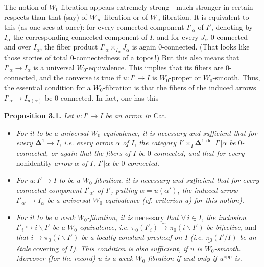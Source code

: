 \documentclass[11pt]{article}
\newcommand{\printedpage}[1]{\marginpar{\footnotesize p.~#1}}
\newcommand{\msp}[1]{\marginpar{\footnotesize [#1]}}
\newcommand{\defeq}{\overset{\text{def}}{=}}
\begin{document}
\printedpage{27}
\msp{page 41}
The notion of $W_0$-fibration appears extremely strong - much stronger in certain respects than that (say) of $W_\infty$-fibration or of $W_\omega$-fibration. It is equivalent to this (as one sees at once): for every connected component $I'_\alpha$ of $I'$, denoting by $I_\alpha$ the corresponding connected component of $I$, and for every $J_\alpha$ 0-connected and over $I_\alpha$, the fiber product $I'_\alpha \times_{I_\alpha} J_\alpha$ is again 0-connected. (That looks like those stories of total 0-connectedness of a topos\,!) But this also means that $I'_\alpha \longrightarrow I_\alpha$ is a universal $W_0$-equivalence. This implies that its fibers are 0-connected, and the converse is true if $u : I' \longrightarrow I$ is $W_0$-proper or $W_0$-smooth. Thus, the essential condition for a $W_0$-fibration is that the fibers of the induced arrows $I'_\alpha \longrightarrow I_{u(\alpha)}$ be 0-connected. In fact, one has this

\noindent\textbf{Proposition 3.1.} \textit{Let $u : I' \longrightarrow I$ be an arrow in} Cat.
\begin{itemize}
\item[\textit{a)}] \textit{For it to be a universal $W_0$-equivalence, it is necessary and sufficient that for every $\boldsymbol{\Delta}^1 \longrightarrow I$, i.e. every arrow $\alpha$ of $I$, the category $I' \times_I \boldsymbol{\Delta}^1 \defeq I'|\alpha$ be $0$-connected, or again that the fibers of $I$ be $0$-connected, and that for every} nonidentity \textit{arrow $\alpha$ of $I$, $I'|\alpha$ be $0$-connected.}
\item[\textit{b)}] \textit{For $u : I' \longrightarrow I$ to be a $W_0$-fibration, it is necessary and sufficient that for every connected component $I'_{\alpha'}$ of}
\msp{page 42}
\textit{$I'$, putting $\alpha = u(\alpha')$, the induced arrow $I'_{\alpha'} \longrightarrow I_\alpha$ be a universal $W_0$-equivalence (cf. criterion a) for this notion).}
\item[\textit{c)}] \textit{For it to be a weak $W_0$-fibration, it is} necessary \textit{that $\forall\, i \in I$, the inclusion $I'_i \hookrightarrow i\backslash I'$ be a $W_0$-equivalence, i.e. $\pi_0(I'_i) \xrightarrow{\;\sim\;} \pi_0(i\backslash I')$ be bijective,} and \textit{that $i \longmapsto \pi_0(i\backslash I')$ be a locally constant presheaf on $I$ (i.e. $\underline{\pi_0}(I'/I)$ be an étale} covering \textit{of $I$). This condition is also sufficient, if $u$ is $W_0$-smooth. Moreover (for the record) $u$ is a weak $W_0$-fibration if and only if $u^{\mathrm{opp}}$ is.}
\end{itemize}
\end{document}
